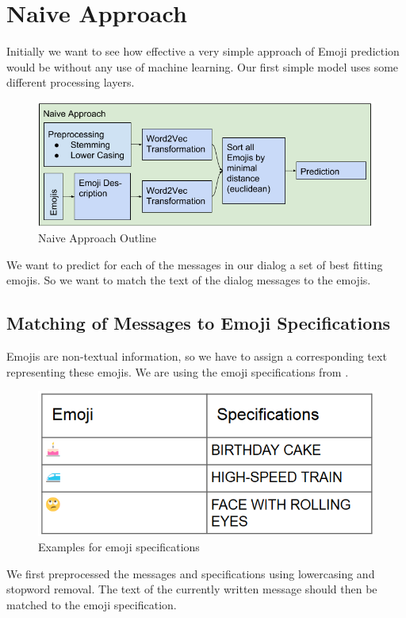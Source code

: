 \documentclass{article}
\begin{document}
\section{Naive Approach}
Initially we want to see how effective a very simple approach of Emoji prediction would be without any use of machine learning. Our first simple model uses some different processing layers. 
\begin{figure}[h!]
\centering
\includegraphics[scale=0.45]{images/naive_approach_1.png}
\caption{Naive Approach Outline}
\label{fig:naiveApproach}
\end{figure}
We want to predict for each of the messages in our dialog a set of best fitting emojis. So we want to match the text of the dialog messages to the emojis. 

\subsection{Matching of Messages to Emoji Specifications}
Emojis are non-textual information, so we have to assign a corresponding text representing these emojis. We are using the emoji specifications from \citep{EmojiSpec}.
\begin{figure}[h!]
\centering
\includegraphics[scale=0.45]{images/emojiSpecs.png}
\caption{Examples for emoji specifications}
\label{fig:naiveApproach}
\end{figure}
We first preprocessed the messages and specifications using lowercasing and stopword removal. The text of the currently written message should then be matched to the emoji specification.
\end{document}
